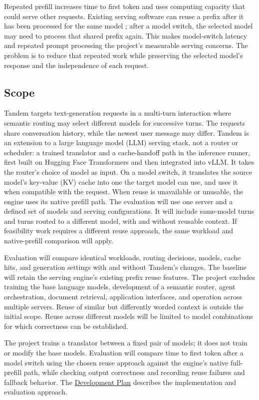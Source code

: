 \documentclass[11pt]{article}
\begin{document}
Repeated prefill increases time to first token and uses computing
capacity that could serve other requests. Existing serving software can
reuse a prefix after it has been processed for the same model
\cite{vLLMPrefixCaching}; after a model switch, the selected model may need
to process that shared prefix again. This makes model-switch latency and
repeated prompt processing the project's measurable serving concerns. The
problem is to reduce that repeated work while preserving the selected
model's response and the independence of each request.

\subsection{Scope}
\label{sec:scope}

Tandem targets text-generation requests in a multi-turn interaction where
semantic routing may select different models for successive turns. The
requests share conversation history, while the newest user message may
differ. Tandem is an extension to a large language model (LLM) serving
stack, not a router or scheduler: a trained translator and a cache-handoff
path in the inference runner, first built on Hugging Face Transformers and
then integrated into vLLM. It takes the router's choice of model as input.
On a model switch, it translates the source model's key-value (KV) cache
into one the target model can use, and uses it when compatible with the
request. When reuse is unavailable or
unusable, the engine uses its native prefill path. The evaluation will use
one server and a defined set of models and serving configurations. It will
include same-model turns and turns routed to a different model, with and
without reusable context. If feasibility work requires a different reuse
approach, the same workload and native-prefill comparison will apply.

Evaluation will compare identical workloads, routing decisions, models,
cache hits, and generation settings with and without Tandem's changes. The
baseline will retain the serving engine's existing prefix reuse features.
The project excludes training the base language models, development of a
semantic router, agent orchestration, document retrieval, application
interfaces, and operation across multiple servers. Reuse of similar but
differently worded context is outside the initial scope. Reuse across
different models will be limited to model combinations for which correctness
can be established.

The project trains a translator between a fixed pair of models; it does
not train or modify the base models. Evaluation will compare time to first token after a model switch using the
chosen reuse approach against the engine's native full-prefill path, while
checking output correctness and recording reuse failures and fallback
behavior. The
\href{../DevelopmentPlan/DevelopmentPlan.pdf}{Development Plan} describes
the implementation and evaluation approach.
\end{document}
